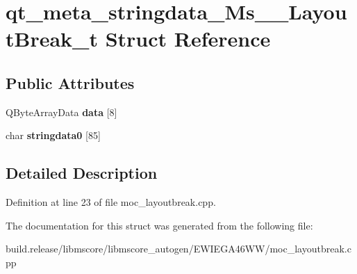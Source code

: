 \hypertarget{structqt__meta__stringdata___ms_____layout_break__t}{}\section{qt\+\_\+meta\+\_\+stringdata\+\_\+\+Ms\+\_\+\+\_\+\+Layout\+Break\+\_\+t Struct Reference}
\label{structqt__meta__stringdata___ms_____layout_break__t}
\subsection*{Public Attributes}
\begin{DoxyCompactItemize}
\item 
\mbox{\label{structqt__meta__stringdata___ms_____layout_break__t_a4a5f99dae679fa1dc5cba3a295d67280}} 
Q\+Byte\+Array\+Data {\bfseries data} \mbox{[}8\mbox{]}
\item 
\mbox{\label{structqt__meta__stringdata___ms_____layout_break__t_aa775c978bbe1ae36ef42ff66c77f057a}} 
char {\bfseries stringdata0} \mbox{[}85\mbox{]}
\end{DoxyCompactItemize}


\subsection{Detailed Description}


Definition at line 23 of file moc\+\_\+layoutbreak.\+cpp.



The documentation for this struct was generated from the following file\+:\begin{DoxyCompactItemize}
\item 
build.\+release/libmscore/libmscore\+\_\+autogen/\+E\+W\+I\+E\+G\+A46\+W\+W/moc\+\_\+layoutbreak.\+cpp\end{DoxyCompactItemize}
